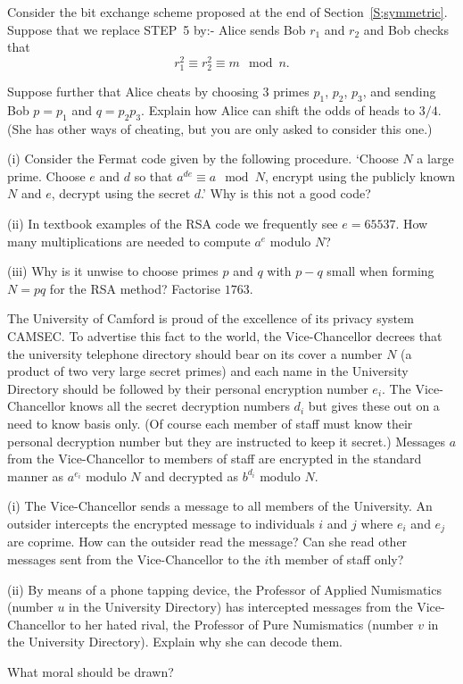 \begin{question}\label{Q;Alice cheats}\label{C4.12} 
Consider the bit exchange scheme
proposed at the end of Section~\ref{S;symmetric}.
Suppose that we replace STEP~5 by:- Alice sends Bob
$r_{1}$ and $r_{2}$ and Bob checks that 
\[r_{1}^{2}\equiv r_{2}^{2}\equiv m\mod{n}.\]
 
Suppose further that Alice cheats by
choosing $3$ primes $p_{1}$, $p_{2}$, $p_{3}$,
and sending Bob $p=p_{1}$ and $q=p_{2}p_{3}$.
Explain how Alice can shift the odds of heads
to $3/4$. (She has other ways of cheating, but
you are only asked to consider this one.)
\end{question}
\begin{question}\label{C4.13}
(i) Consider the Fermat code
given by the following procedure.
`Choose $N$ a large prime. Choose $e$ and $d$ so that
$a^{de}\equiv a \mod{N}$, encrypt using the publicly known
$N$ and $e$, decrypt using the secret $d$.'
Why is this not a good code?

(ii) In textbook examples of the RSA code we frequently see
$e=65537$. How many multiplications
are needed to
compute $a^{e}$ modulo $N$?

(iii) Why is it unwise to choose primes $p$ and $q$
with $p-q$ small when forming $N=pq$ for the RSA method?
Factorise $1763$.
\end{question}
\begin{question}\label{C4.14} The University of Camford is proud of 
the excellence of its privacy system CAMSEC. 
To advertise this
fact to the world, the Vice-Chancellor decrees that 
the university telephone directory should bear on its cover
a number $N$ (a product of two very large secret primes)
and each name in the University Directory should 
be followed by their personal encryption number $e_{i}$.
The Vice-Chancellor knows all the secret decryption numbers
$d_{i}$ but gives these out on a need to know basis only.
(Of course each member of staff must know their
personal decryption number but they are instructed to keep it secret.)
Messages $a$ from the Vice-Chancellor
to members of staff 
are encrypted in the standard manner
as $a^{e_{i}}$ modulo $N$ and decrypted
as $b^{d_{i}}$ modulo $N$.

(i) The Vice-Chancellor sends a message to
all members of the University.
An outsider intercepts the encrypted message to
individuals $i$ and $j$ where $e_{i}$ and $e_{j}$
are coprime. How can the outsider read the message?
Can she read other messages sent from the Vice-Chancellor
to the $i$th member of staff only?

(ii) By means of a phone tapping device,
the  Professor of Applied Numismatics
(number $u$ in the University Directory)
has intercepted messages from the
Vice-Chancellor to her
hated rival, the
Professor of Pure Numismatics
(number $v$ in the University Directory).
Explain why she can decode them.

What moral should be drawn?
\end{question}
  

